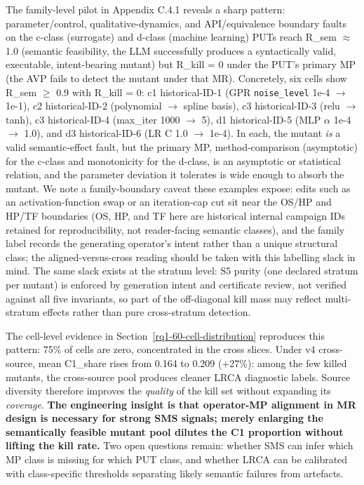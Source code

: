 \documentclass[manuscript,screen,review]{acmart}
\begin{document}
The family-level pilot in Appendix C.4.1 reveals a sharp pattern:
parameter/control, qualitative-dynamics, and API/equivalence boundary
faults on the c-class (surrogate) and d-class (machine learning) PUTs
reach R\_sem $\approx$ 1.0 (semantic feasibility, the LLM
successfully produces a syntactically valid, executable, intent-bearing
mutant) but R\_kill = 0 under the PUT's primary MP (the AVP fails to
detect the mutant under that MR). Concretely, six cells show R\_sem $\geq$
0.9 with R\_kill = 0: c1 historical-ID-1 (GPR \texttt{noise\_level} 1e-4 $\to$ 1e-1),
c2 historical-ID-2 (polynomial $\to$ spline basis), c3 historical-ID-3 (relu $\to$ tanh), c3 historical-ID-4
(max\_iter 1000 $\to$ 5), d1 historical-ID-5 (MLP $\alpha$ 1e-4 $\to$ 1.0), and d3 historical-ID-6 (LR C 1.0
$\to$ 1e-4). In each, the mutant \emph{is} a valid semantic-effect
fault, but the primary MP, method-comparison (asymptotic) for the
c-class and
monotonicity for the d-class, is an asymptotic or statistical relation,
and the parameter deviation it tolerates is wide enough to absorb the
mutant. We note a family-boundary caveat these examples expose: edits
such as an activation-function swap or an iteration-cap cut sit near
the OS/HP and HP/TF boundaries (OS, HP, and TF here are historical
internal campaign IDs retained for reproducibility, not reader-facing
semantic classes), and the family label records the
generating operator's intent rather than a unique structural class;
the aligned-versus-cross reading should be taken with this labelling
slack in mind. The same slack exists at the stratum level: S5 purity
(one declared stratum per mutant) is enforced by generation intent and
certificate review, not verified against all five invariants, so part
of the off-diagonal kill mass may reflect multi-stratum effects rather
than pure cross-stratum detection.

The cell-level evidence in Section~\ref{rq1-60-cell-distribution} reproduces this pattern: 75\% of cells
are zero, concentrated in the cross slices. Under v4 cross-source, mean
C1\_share rises from 0.164 to 0.209 (+27\%): among the few killed
mutants, the cross-source pool produces cleaner LRCA diagnostic labels.
Source diversity therefore improves the \emph{quality} of the kill set
without expanding its \emph{coverage}. \textbf{The engineering insight is that
operator-MP alignment in MR design is necessary for strong SMS signals;
merely enlarging the semantically feasible mutant pool dilutes the C1
proportion without lifting the kill rate.} Two open questions remain:
whether SMS can infer which MP class is missing for which PUT class, and
whether LRCA can be calibrated with class-specific thresholds separating
likely semantic failures from artefacts.
\end{document}
